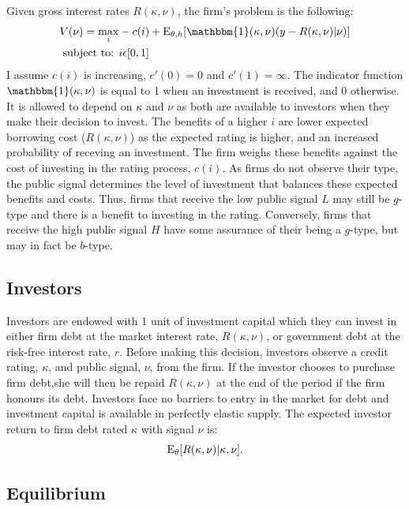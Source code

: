 \documentclass[notitlepage]{article}
\begin{document}
Given gross interest rates $R(\kappa,\nu)$, the firm's problem is the following:
\begin{align}
\label{eq:FP} V(\nu)=\max_{i} & -c(i)+\textup{E}_{\theta,h} [ \mathbbm{1}(\kappa,\nu) (y - R(\kappa,\nu)|\nu ) ]\\
\textup{subject to: } & i\epsilon [0,1] \nonumber
\end{align}
I assume $c(i)$ is increasing, $c'(0)=0$ and $c'(1)=\infty$. The indicator function $\mathbbm{1}(\kappa,\nu)$ is equal to 1 when an investment is received, and 0 otherwise. It is allowed to depend on $\kappa$ and $\nu$ as both are available to investors when they make their decision to invest. The benefits of a higher $i$ are lower expected borrowing cost ($R(\kappa,\nu)$) as the expected rating is higher, and an increased probability of receving an investment. The firm weighs these benefits against the cost of investing in the rating process, $c(i)$. As firms do not observe their type, the public signal determines the level of investment that balances these expected benefits and costs. Thus, firms that receive the low public signal $L$ may still be $g$-type and there is a benefit to investing in the rating. Conversely, firms that receive the high public signal $H$ have some assurance of their being a $g$-type, but may in fact be $b$-type. 

\subsection{Investors}
Investors are endowed with 1 unit of investment capital which they can invest in either firm debt at the market interest rate, $R(\kappa,\nu)$, or government debt at the risk-free interest rate, $r$. Before making this decision, investors observe a credit rating, $\kappa$, and public signal, $\nu$, from the firm. If the investor chooses to purchase firm debt,she will then be repaid $R(\kappa,\nu)$ at the end of the period if the firm honours its debt. Investors face no barriers to entry in the market for debt and investment capital is available in perfectly elastic supply. The expected investor return to firm debt rated $\kappa$ with signal $\nu$ is:
\begin{equation}
\textup{E}_{\theta} [R(\kappa,\nu)|\kappa,\nu ].
\end{equation}

\subsection{Equilibrium}
\end{document}
